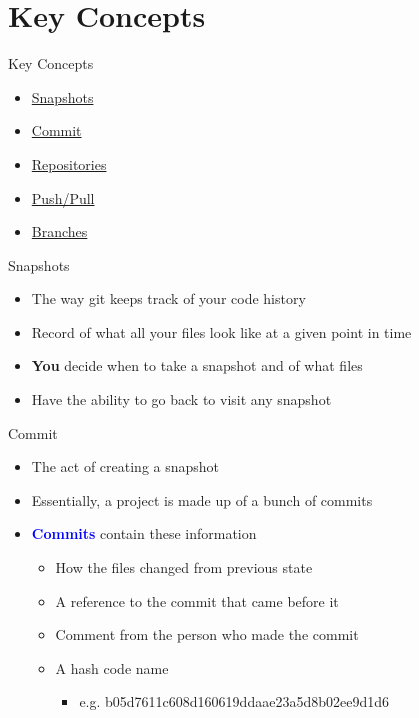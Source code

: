 \documentclass[11pt]{beamer}
\begin{document}
\section{Key Concepts}
\begin{frame}{Key Concepts}
\begin{itemize}
	\item
	\hyperlink{snap}{Snapshots}
	\item
	\hyperlink{commit}{Commit}
	\item
	\hyperlink{repo}{Repositories}
	\item
	\hyperlink{push}{Push/Pull}
	\item
	\hyperlink{branch}{Branches}	
\end{itemize}
\end{frame}

\begin{frame}{Snapshots}\label{snap}
\begin{itemize}
	\item
	The way git keeps track of your code history
	\item
	Record of what all your files look like at a given point in time
	\item
	\textbf{You} decide when to take a snapshot and of what files
	\item
	Have the ability to go back to visit any snapshot
\end{itemize}
\end{frame}

\begin{frame}{Commit}\label{commit}
\begin{itemize}
	\item
	The act of creating a snapshot
	\item
	Essentially, a project is made up of a bunch of commits
	\item
	\textcolor{blue}{\textbf{Commits}} contain these information
	\begin{itemize}
		\item How the files changed from previous state
		\item A reference to the commit that came before it
		\item Comment from the person who made the commit
		\item A hash code name
		\begin{itemize}
			\item e.g. b05d7611c608d160619ddaae23a5d8b02ee9d1d6
		\end{itemize}
	\end{itemize}
\end{itemize}
\end{frame}
\end{document}
